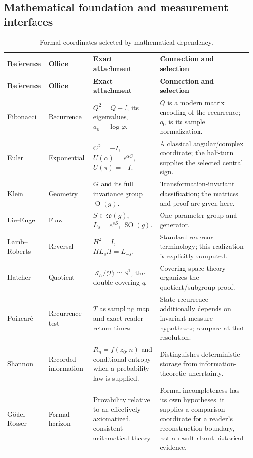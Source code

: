 \documentclass[10pt,letterpaper]{article}
\theoremstyle{definition}\newtheorem{definition}[theorem]{Definition}
\newcommand{\SO}{\operatorname{SO}}
\newcommand{\OO}{\operatorname{O}}
\newcommand{\Ah}{\mathcal A_h}
\newcommand{\ph}{\varphi}
\begin{document}
\subsection*{Mathematical foundation and measurement interfaces}
\small
\begin{longtable}{@{}p{1.03in}p{0.68in}p{2.20in}p{1.99in}@{}}
\caption{Formal coordinates selected by mathematical dependency.}\label{tab:foundations}\\
\toprule
\textbf{Reference}&\textbf{Office}&\textbf{Exact attachment}&\textbf{Connection and selection}\\\midrule\endfirsthead
\toprule\textbf{Reference}&\textbf{Office}&\textbf{Exact attachment}&\textbf{Connection and selection}\\\midrule\endhead
Fibonacci \cite{fibonacci}& Recurrence & $Q^2=Q+I$, its eigenvalues, $a_0=\log\ph$. & $Q$ is a modern matrix encoding of the recurrence; $a_0$ is its sample normalization.\\
Euler \cite{euler}& Exponential & $C^2=-I$, $U(\alpha)=e^{\alpha C}$, $U(\pi)=-I$. & A classical angular/complex coordinate; the half-turn supplies the selected central sign.\\
Klein \cite{klein}& Geometry & $G$ and its full invariance group $\OO(g)$. & Transformation-invariant classification; the matrices and proof are given here.\\
Lie--Engel \cite{lieengel}& Flow & $S\in\mathfrak{so}(g)$, $L_s=e^{sS}$, $\SO(g)$. & One-parameter group and generator.\\
Lamb--Roberts \cite{lambroberts}& Reversal & $H^2=I$, $HL_sH=L_{-s}$. & Standard reversor terminology; this realization is explicitly computed.\\
Hatcher \cite{hatcher}& Quotient & $\Ah/\langle T\rangle\cong S^1$, the double covering $q$. & Covering-space theory organizes the quotient/subgroup proof.\\
Poincar\'e \cite{poincare}& Recurrence test & $T$ as sampling map and exact reader-return times. & State recurrence additionally depends on invariant-measure hypotheses; compare at that resolution.\\
Shannon \cite{shannon1,shannon2}& Recorded information & $R_n=f(z_0,n)$ and conditional entropy when a probability law is supplied. & Distinguishes deterministic storage from information-theoretic uncertainty.\\
G\"odel--Rosser \cite{godel1931,rosser1936}& Formal horizon & Provability relative to an effectively axiomatized, consistent arithmetical theory. & Formal incompleteness has its own hypotheses; it supplies a comparison coordinate for a reader's reconstruction boundary, not a result about historical evidence.\\
\bottomrule
\end{longtable}
\normalsize
\end{document}
